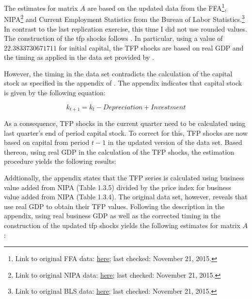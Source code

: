 

The estimates for matrix $A$ are based on the updated data from the FFA\footnote{Link to original FFA data: \href{http://www.federalreserve.gov/datadownload/Download.aspx?rel=Z1&series=0158dbd07710fd0793be0d27731bac4c&filetype=spreadsheetml&label=include&layout=seriescolumn&from=03/01/1952&to=12/31/2015}{here}; last checked: November 21, 2015.},
NIPA\footnote{Link to original NIPA data: \href{http://www.bea.gov//national/nipaweb/DownSS2.asp}{here}; last checked: November 21, 2015.} 
and Current Employment Statistics from the Bureau of Labor Statistics.\footnote{Link to original BLS data: \href{https://research.stlouisfed.org/fred2/series/AWHI/downloaddata}{here}; last checked: November 21, 2015.} 
In contrast to the last replication exercise, this time I did not use rounded values. The construction of the tfp shocks follows \citet{JERMANNfinancial}. In particular, using a value of $22.3833730671711$ for initial capital, the TFP shocks are based on real GDP and the timing as applied in the data set provided by \citeauthor{JERMANNfinancial}.

However, the timing in the data set contradicts the calculation of the capital stock as specified in the appendix of \citeauthor{JERMANNfinancial}. The appendix indicates that capital stock is given by the following equation:

\begin{equation} \label{eq:capital_stock}
k_{t+1} = k_{t} - Depreciation + Investment
\end{equation} 

As a consequence, TFP shocks in the current quarter need to be calculated using last quarter's end of period capital stock. To correct for this, TFP shocks are now based on capital from period $t-1$ in the updated version of the data set. Based thereon, using real GDP in the calculation of the TFP shocks, the estimation procedure yields the following results:


Addtionally, the appendix states that the TFP series is calculated using business value added from NIPA (Table 1.3.5) divided by the price index for business value added from NIPA (Table 1.3.4). The original data set, however, reveals that \citeauthor{JERMANNfinancial} use real GDP to obtain their TFP values. Following the description in the appendix, using real business GDP as well as the corrected timing in the construction of the updated tfp shocks yields the following estimates for matrix $A$:


